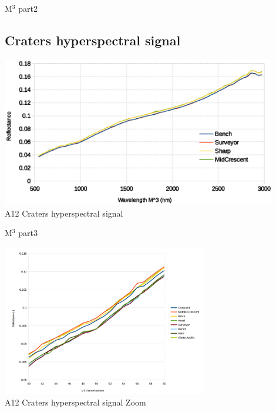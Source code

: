\documentclass[aspectratio=169,unknownkeysallowed,xcolor=dvipsnames,beamer]{beamer} %
\begin{document}
\begin{frame}[fragile]{M$^3$ part2}
\subsection{Craters hyperspectral signal}
\begin{center}
  \includegraphics[width=12cm]{images/fig4}\\
  A12 Craters hyperspectral signal
  \end{center}
\end{frame}

\begin{frame}[fragile]{M$^3$ part3}
\begin{center}
  \includegraphics[width=9cm]{images/fig5}\\
  A12 Craters hyperspectral signal Zoom
  \end{center}
\end{frame}
\end{document}
